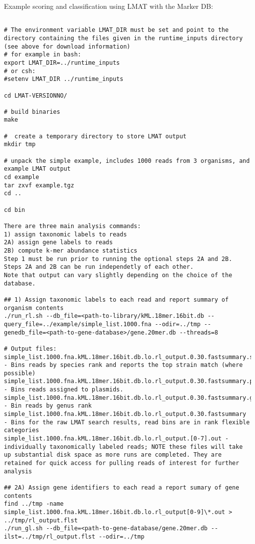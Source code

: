 \documentclass[11pt]{article}
\begin{document}
   
Example scoring and classification using LMAT with the Marker DB:

\begin{verbatim}

# The environment variable LMAT_DIR must be set and point to the directory containing the files given in the runtime_inputs directory (see above for download information)
# for example in bash:
export LMAT_DIR=../runtime_inputs
# or csh:
#setenv LMAT_DIR ../runtime_inputs

cd LMAT-VERSIONNO/

# build binaries
make

#  create a temporary directory to store LMAT output
mkdir tmp

# unpack the simple example, includes 1000 reads from 3 organisms, and example LMAT output
cd example
tar zxvf example.tgz
cd ..

cd bin

There are three main analysis commands: 
1) assign taxonomic labels to reads
2A) assign gene labels to reads
2B) compute k-mer abundance statistics
Step 1 must be run prior to running the optional steps 2A and 2B. Steps 2A and 2B can be run independetly of each other.
Note that output can vary slightly depending on the choice of the database.

## 1) Assign taxonomic labels to each read and report summary of organism contents
./run_rl.sh --db_file=<path-to-library/kML.18mer.16bit.db --query_file=../example/simple_list.1000.fna --odir=../tmp --genedb_file=<path-to-gene-database>/gene.20mer.db --threads=8

# Output files:
simple_list.1000.fna.kML.18mer.16bit.db.lo.rl_output.0.30.fastsummary.species - Bins reads by species rank and reports the top strain match (where possible)
simple_list.1000.fna.kML.18mer.16bit.db.lo.rl_output.0.30.fastsummary.plasmid - Bins reads assigned to plasmids.
simple_list.1000.fna.kML.18mer.16bit.db.lo.rl_output.0.30.fastsummary.genus - Bin reads by genus rank
simple_list.1000.fna.kML.18mer.16bit.db.lo.rl_output.0.30.fastsummary - Bins for the raw LMAT search results, read bins are in rank flexible categories
simple_list.1000.fna.kML.18mer.16bit.db.lo.rl_output.[0-7].out - individually taxonomically labeled reads; NOTE these files will take up substantial disk space as more runs are completed. They are retained for quick access for pulling reads of interest for further analysis 

## 2A) Assign gene identifiers to each read a report sumary of gene contents
find ../tmp -name simple_list.1000.fna.kML.18mer.16bit.db.lo.rl_output[0-9]\*.out > ../tmp/rl_output.flst
./run_gl.sh --db_file=<path-to-gene-database/gene.20mer.db --ilst=../tmp/rl_output.flst --odir=../tmp 


\end{verbatim}
\end{document}
